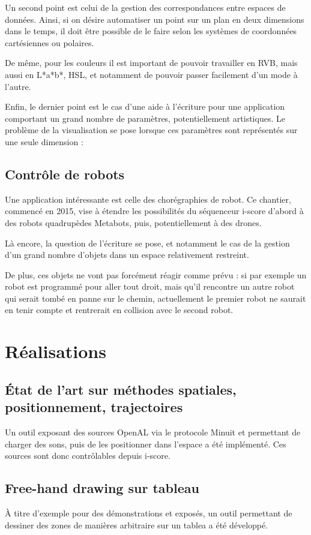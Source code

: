 \documentclass[french]{article}
\begin{document}
Un second point est celui de la gestion des correspondances entre espaces de données. Ainsi, si on désire automatiser un point sur un plan en deux dimensions dans le temps, il doit être possible de le faire selon les systèmes de coordonnées cartésiennes ou polaires.

De même, pour les couleurs il est important de pouvoir travailler en RVB, mais aussi en L*a*b*, HSL, et notamment de pouvoir passer facilement d'un mode à l'autre.

Enfin, le dernier point est le cas d'une aide à l'écriture pour une application comportant un grand nombre de paramètres, potentiellement artistiques. Le problème de la visualisation se pose lorsque ces paramètres sont représentés sur une seule dimension : %

\subsection{Contrôle de robots}
Une application intéressante est celle des chorégraphies de robot. Ce chantier, commencé en 2015, vise à étendre les possibilités du séquenceur i-score d'abord à des robots quadrupèdes Metabots, puis, potentiellement à des drones.

Là encore, la question de l'écriture se pose, et notamment le cas de la gestion d'un grand nombre d'objets dans un espace relativement restreint.

De plus, ces objets ne vont pas forcément réagir comme prévu : si par exemple un robot est programmé pour aller tout droit, mais qu'il rencontre un autre robot qui serait tombé en panne sur le chemin, actuellement le premier robot ne saurait en tenir compte et rentrerait en collision avec le second robot.


\section{Réalisations}
\subsection{État de l'art sur méthodes spatiales, positionnement, trajectoires}


Un outil exposant des sources OpenAL via le protocole Minuit et permettant de charger des sons, puis de les positionner dans l'espace a été implémenté. Ces sources sont donc contrôlables depuis i-score.

\subsection{Free-hand drawing sur tableau}
À titre d'exemple pour des démonstrations et exposés, un outil permettant de dessiner des zones de manières arbitraire sur un tablea a été développé. %
\end{document}

